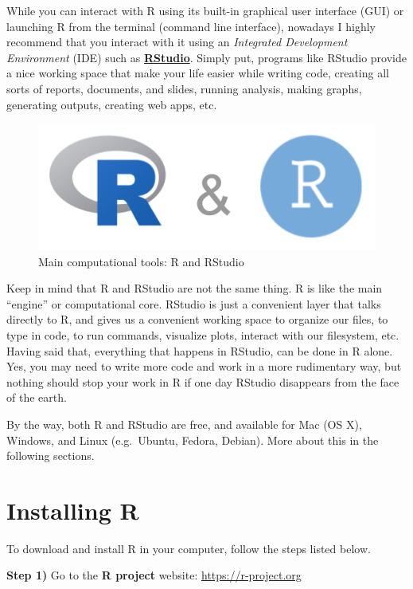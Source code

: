 \documentclass[
]{book}
\begin{document}
While you can interact with R using its built-in graphical user interface (GUI)
or launching R from the terminal (command line interface), nowadays I highly
recommend that you interact with it using an
\emph{Integrated Development Environment} (IDE) such as
\href{https://www.rstudio.com/}{\textbf{RStudio}}. Simply put,
programs like RStudio provide a nice working space that make your life easier
while writing code, creating all sorts of reports, documents, and slides,
running analysis, making graphs, generating outputs, creating web apps, etc.

\begin{figure}

{\centering \includegraphics[width=0.3\linewidth]{images/rstudio/r-rstudio-logos} 

}

\caption{Main computational tools: R and RStudio}\label{fig:unnamed-chunk-4}
\end{figure}

Keep in mind that R and RStudio are not the same thing. R is like the main\\
``engine'' or computational core. RStudio is just a convenient layer that
talks directly to R, and gives us a convenient working space to organize our
files, to type in code, to run commands, visualize plots, interact with our
filesystem, etc. Having said that, everything that happens in RStudio, can
be done in R alone. Yes, you may need to write more code and work in a more
rudimentary way, but nothing should stop your work in R if one day RStudio
disappears from the face of the earth.

By the way, both R and RStudio are free, and available for Mac (OS X), Windows,
and Linux (e.g.~Ubuntu, Fedora, Debian). More about this in the following
sections.

\hypertarget{installing-r}{%
\section{Installing R}\label{installing-r}}

To download and install R in your computer, follow the steps listed below.

\textbf{Step 1)} Go to the \textbf{R project} website: \url{https://r-project.org}
\end{document}
